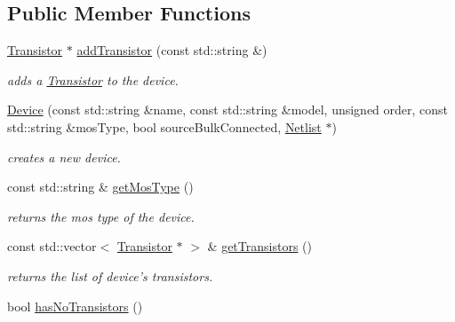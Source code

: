 \subsection*{Public Member Functions}
\begin{DoxyCompactItemize}
\item 
\hyperlink{class_open_chams_1_1_transistor}{Transistor} $\ast$ \hyperlink{class_open_chams_1_1_device_ad45d34f8765dd113a5b12289efe66c07}{add\-Transistor} (const std\-::string \&)
\begin{DoxyCompactList}\small\item\em adds a \hyperlink{class_open_chams_1_1_transistor}{Transistor} to the device. \end{DoxyCompactList}\item 
\hyperlink{class_open_chams_1_1_device_af5d1871d38a605955d7848d07df6d9a4}{Device} (const std\-::string \&name, const std\-::string \&model, unsigned order, const std\-::string \&mos\-Type, bool source\-Bulk\-Connected, \hyperlink{class_open_chams_1_1_netlist}{Netlist} $\ast$)
\begin{DoxyCompactList}\small\item\em creates a new device. \end{DoxyCompactList}\item 
\hypertarget{class_open_chams_1_1_device_a831ce553c23908f447a5be332ecd5946}{const std\-::string \& \hyperlink{class_open_chams_1_1_device_a831ce553c23908f447a5be332ecd5946}{get\-Mos\-Type} ()}\label{class_open_chams_1_1_device_a831ce553c23908f447a5be332ecd5946}

\begin{DoxyCompactList}\small\item\em returns the mos type of the device. \end{DoxyCompactList}\item 
\hypertarget{class_open_chams_1_1_device_a4033525cab6387eb057f71f5feed9802}{const std\-::vector$<$ \hyperlink{class_open_chams_1_1_transistor}{Transistor} $\ast$ $>$ \& \hyperlink{class_open_chams_1_1_device_a4033525cab6387eb057f71f5feed9802}{get\-Transistors} ()}\label{class_open_chams_1_1_device_a4033525cab6387eb057f71f5feed9802}

\begin{DoxyCompactList}\small\item\em returns the list of device's transistors. \end{DoxyCompactList}\item 
\hypertarget{class_open_chams_1_1_device_aa9d93f306256ac57b8bb8a4cb436c8d3}{bool \hyperlink{class_open_chams_1_1_device_aa9d93f306256ac57b8bb8a4cb436c8d3}{has\-No\-Transistors} ()}\label{class_open_chams_1_1_device_aa9d93f306256ac57b8bb8a4cb436c8d3}


\end{DoxyCompactItemize}
